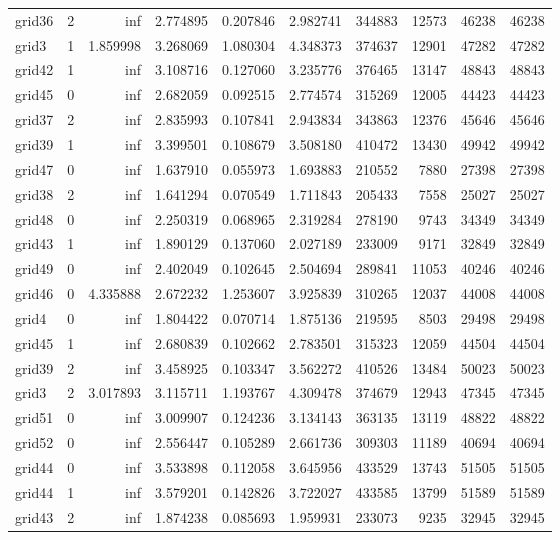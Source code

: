 \begin{longtable}{|l|r|r|r|r|r|r|r|r|r|}
grid36 & 2 & inf & 2.774895 & 0.207846 & 2.982741 & 344883 & 12573 & 46238 & 46238 \\
grid3 & 1 & 1.859998 & 3.268069 & 1.080304 & 4.348373 & 374637 & 12901 & 47282 & 47282 \\
grid42 & 1 & inf & 3.108716 & 0.127060 & 3.235776 & 376465 & 13147 & 48843 & 48843 \\
grid45 & 0 & inf & 2.682059 & 0.092515 & 2.774574 & 315269 & 12005 & 44423 & 44423 \\
grid37 & 2 & inf & 2.835993 & 0.107841 & 2.943834 & 343863 & 12376 & 45646 & 45646 \\
grid39 & 1 & inf & 3.399501 & 0.108679 & 3.508180 & 410472 & 13430 & 49942 & 49942 \\
grid47 & 0 & inf & 1.637910 & 0.055973 & 1.693883 & 210552 & 7880 & 27398 & 27398 \\
grid38 & 2 & inf & 1.641294 & 0.070549 & 1.711843 & 205433 & 7558 & 25027 & 25027 \\
grid48 & 0 & inf & 2.250319 & 0.068965 & 2.319284 & 278190 & 9743 & 34349 & 34349 \\
grid43 & 1 & inf & 1.890129 & 0.137060 & 2.027189 & 233009 & 9171 & 32849 & 32849 \\
grid49 & 0 & inf & 2.402049 & 0.102645 & 2.504694 & 289841 & 11053 & 40246 & 40246 \\
grid46 & 0 & 4.335888 & 2.672232 & 1.253607 & 3.925839 & 310265 & 12037 & 44008 & 44008 \\
grid4 & 0 & inf & 1.804422 & 0.070714 & 1.875136 & 219595 & 8503 & 29498 & 29498 \\
grid45 & 1 & inf & 2.680839 & 0.102662 & 2.783501 & 315323 & 12059 & 44504 & 44504 \\
grid39 & 2 & inf & 3.458925 & 0.103347 & 3.562272 & 410526 & 13484 & 50023 & 50023 \\
grid3 & 2 & 3.017893 & 3.115711 & 1.193767 & 4.309478 & 374679 & 12943 & 47345 & 47345 \\
grid51 & 0 & inf & 3.009907 & 0.124236 & 3.134143 & 363135 & 13119 & 48822 & 48822 \\
grid52 & 0 & inf & 2.556447 & 0.105289 & 2.661736 & 309303 & 11189 & 40694 & 40694 \\
grid44 & 0 & inf & 3.533898 & 0.112058 & 3.645956 & 433529 & 13743 & 51505 & 51505 \\
grid44 & 1 & inf & 3.579201 & 0.142826 & 3.722027 & 433585 & 13799 & 51589 & 51589 \\
grid43 & 2 & inf & 1.874238 & 0.085693 & 1.959931 & 233073 & 9235 & 32945 & 32945 \\

\end{longtable}
